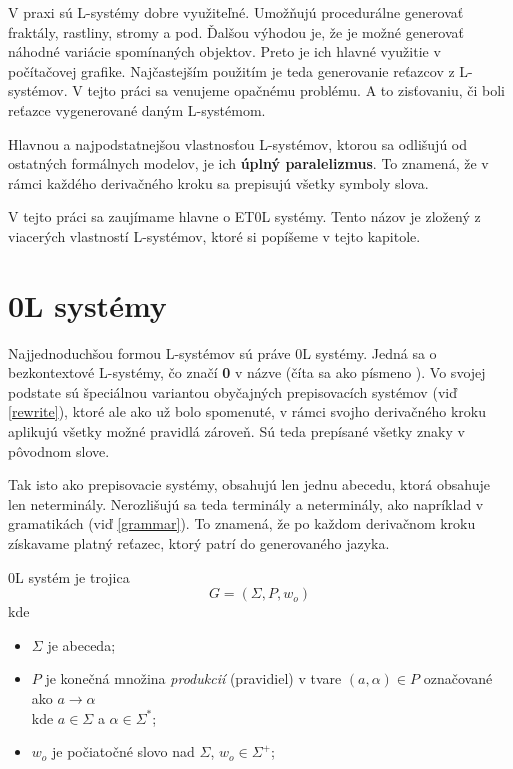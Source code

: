 V praxi sú L-systémy dobre využiteľné. Umožňujú procedurálne generovať fraktály, rastliny, stromy a pod. Ďalšou výhodou je, že je možné generovať náhodné variácie spomínaných objektov. Preto je ich hlavné využitie v počítačovej grafike. Najčastejším použitím je teda generovanie reťazcov z L-systémov. V tejto práci sa venujeme opačnému problému. A to zisťovaniu, či boli reťazce vygenerované daným L-systémom.

Hlavnou a najpodstatnejšou vlastnosťou L-systémov, ktorou sa odlišujú od ostatných formálnych modelov, je ich \textbf{úplný paralelizmus}. To znamená, že v rámci každého derivačného kroku sa prepisujú všetky symboly slova.

V tejto práci sa zaujímame hlavne o ET0L systémy. Tento názov je zložený z viacerých vlastností L-systémov, ktoré si popíšeme v tejto kapitole.

\section{0L systémy}

Najjednoduchšou formou L-systémov sú práve 0L systémy. Jedná sa o bezkontextové L-systémy, čo značí \textbf{0} v názve (číta sa ako písmeno ). Vo svojej podstate sú špeciálnou variantou obyčajných prepisovacích systémov \cite{salomaa} (viď \ref{rewrite}), ktoré ale ako už bolo spomenuté, v rámci svojho derivačného kroku aplikujú všetky možné pravidlá zároveň. Sú teda prepísané všetky znaky v pôvodnom slove.

Tak isto ako prepisovacie systémy, obsahujú len jednu abecedu, ktorá obsahuje len neterminály. Nerozlišujú sa teda terminály a neterminály, ako napríklad v gramatikách (viď \ref{grammar}). To znamená, že po každom derivačnom kroku získavame platný reťazec, ktorý patrí do generovaného jazyka.


\begin{definition}
\label{0L}

0L systém je trojica
\[ G = (\Sigma, P, w_o) \]
kde

\begin{itemize}
    \itemsep0.2em 
    \item[] $ \Sigma $ je abeceda;
    \item[] $ P $ je konečná množina \textit{produkcií} (pravidiel) v tvare $ (a, \alpha) \in P $ označované ako $ a \to \alpha $  \\ kde $ a \in \Sigma $ a $ \alpha \in \Sigma^* $;
    \item[] $ w_o $ je počiatočné slovo nad $ \Sigma$, $w_o \in \Sigma^+ $;
\end{itemize}
\end{definition}
\hfill\\


